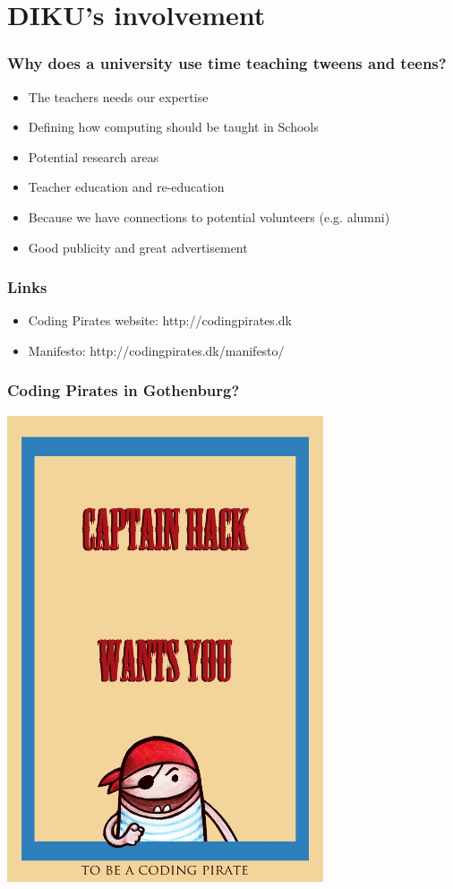 \documentclass{beamer}
\begin{document}
\section{DIKU's involvement}
\begin{frame}
\frametitle{Why does a university use time teaching tweens and teens?}
\begin{itemize}
\item The teachers needs our expertise
\item Defining how computing should be taught in Schools
\item Potential research areas
\item Teacher education and re-education
\item Because we have connections to potential volunteers (e.g. alumni)
\item Good publicity and great advertisement
\end{itemize}
\end{frame}

\begin{frame}
  \frametitle{Links}
  \begin{itemize}
  \item Coding Pirates website: http://codingpirates.dk
  \item Manifesto: http://codingpirates.dk/manifesto/
  \end{itemize}
\end{frame}

\begin{frame}
  \frametitle{Coding Pirates in Gothenburg?}
  \begin{center}
    \includegraphics[origin=c,angle=-20,width=0.7\textwidth]{imagery/wanted}
  \end{center}

\end{frame}
\end{document}
